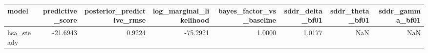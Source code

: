 \begin{tabular}{lrrrrrrr}
\toprule
model & predictive\_score & posterior\_predictive\_rmse & log\_marginal\_likelihood & bayes\_factor\_vs\_baseline & sddr\_delta\_bf01 & sddr\_theta\_bf01 & sddr\_gamma\_bf01 \\
\midrule
hsa\_steady & -21.6943 & 0.9224 & -75.2921 & 1.0000 & 1.0177 & NaN & NaN \\
\bottomrule
\end{tabular}
